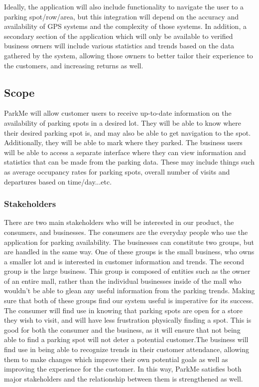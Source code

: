 \documentclass[]{article}
\begin{document}
Ideally, the application will also include functionality to navigate the user to a parking spot/row/area, but this integration will depend on the accuracy and availability of GPS systems and the complexity of those systems. In addition, a secondary section of the application which will only be available to verified business owners will include various statistics and trends based on the data gathered by the system, allowing those owners to better tailor their experience to the customers, and increasing returns as well.



\subsection{Scope}
ParkMe will allow customer users to receive up-to-date information on the availability of parking spots in a desired lot. They will be able to know where their desired parking spot is, and may also be able to get navigation to the spot. Additionally, they will be able to mark where they parked.  The business users will be able to access a separate interface where they can view information and statistics that can be made from the parking data. These may include things such as average occupancy rates for parking spots, overall number of visits and departures based on time/day...etc.

\subsubsection{Stakeholders}
There are two main stakeholders who will be interested in our product, the consumers, and businesses. The consumers are the everyday people who use the application for parking availability. The businesses can constitute two groups, but are handled in the same way. One of these groups is the small business, who owns a smaller lot and is interested in customer information and trends. The second group is the large business. This group is composed of entities such as the owner of an entire mall, rather than the individual businesses inside of the mall who wouldn't be able to glean any useful information from the parking trends. Making sure that both of these groups find our system useful is imperative for its success.\\

The consumer will find use in knowing that parking spots are open for a store they wish to visit, and will have less frustration physically finding a spot. This is good for both the consumer and the business, as it will ensure that not being able to find a parking spot will not deter a potential customer.The business will find use in being able to recognize trends in their customer attendance, allowing them to make changes which improve their own potential goals as well as improving the experience for the customer. In this way, ParkMe satisfies both major stakeholders and the relationship between them is strengthened as well.
\end{document}
